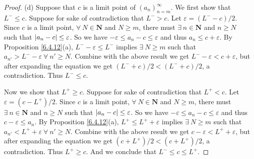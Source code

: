 \begin{proof}{(d)}
    Suppose that \(c\) is a limit point of \((a_n)_{n = m}^\infty\).
    We first show that \(L^- \leq c\).
    Suppose for sake of contradiction that \(L^- > c\).
    Let \(\varepsilon = (L^- - c) / 2\).
    Since \(c\) is a limit point, \(\forall\ N \in \mathbf{N}\) and \(N \geq m\), there must \(\exists\ n \in \mathbf{N}\) and \(n \geq N\) such that \(\abs*{a_n - c} \leq \varepsilon\).
    So we have \(-\varepsilon \leq a_n - c \leq \varepsilon\) and thus \(a_n \leq c + \varepsilon\).
    By Proposition \ref{6.4.12}(a), \(L^- - \varepsilon \leq L^-\) implies \(\exists\ N \geq m\) such that \(a_{n'} > L^- - \varepsilon \ \forall\ n' \geq N\).
    Combine with the above result we get \(L^- - \varepsilon < c + \varepsilon\), but after expanding the equation we get \((L^- + c) / 2 < (L^- + c) / 2\), a contradiction.
    Thus \(L^- \leq c\).

    Now we show that \(L^+ \geq c\).
    Suppose for sake of contradiction that \(L^+ < c\).
    Let \(\varepsilon = (c - L^+) / 2\).
    Since \(c\) is a limit point, \(\forall\ N \in \mathbf{N}\) and \(N \geq m\), there must \(\exists\ n \in \mathbf{N}\) and \(n \geq N\) such that \(\abs*{a_n - c} \leq \varepsilon\).
    So we have \(-\varepsilon \leq a_n - c \leq \varepsilon\) and thus \(c - \varepsilon \leq a_n\).
    By Proposition \ref{6.4.12}(a), \(L^+ \leq L^+ + \varepsilon\) implies \(\exists\ N \geq m\) such that \(a_{n'} < L^+ + \varepsilon \ \forall\ n' \geq N\).
    Combine with the above result we get \(c - \varepsilon < L^+ + \varepsilon\), but after expanding the equation we get \((c + L^+) / 2 < (c + L^+) / 2\), a contradiction.
    Thus \(L^+ \geq c\).
    And we conclude that \(L^- \leq c \leq L^+\).
\end{proof}

